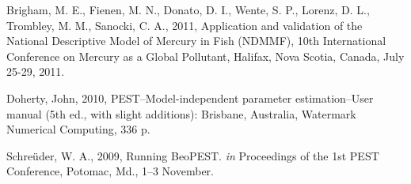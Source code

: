 \documentclass[11pt,twoside,onecolumn]{usgsreport}
\begin{document}
\begin{thebibliography}{}
Brigham, M. E., Fienen, M. N., Donato, D. I., Wente, S. P., Lorenz, D. L., Trombley, M. M.,  Sanocki, C. A., 2011, Application and validation of the National Descriptive Model of Mercury in Fish (NDMMF), 10th International Conference on Mercury as a Global Pollutant, Halifax, Nova Scotia, Canada, July 25-29, 2011.

Doherty, John, 2010, PEST--Model-independent parameter estimation--User manual (5th ed., with slight additions): Brisbane, Australia, Watermark Numerical Computing, 336 p.

Schre\"uder, W. A., 2009, Running BeoPEST. \emph{in} Proceedings of the 1st PEST Conference, Potomac, Md., 1--3 November.

\end{thebibliography}{}
\end{document}

